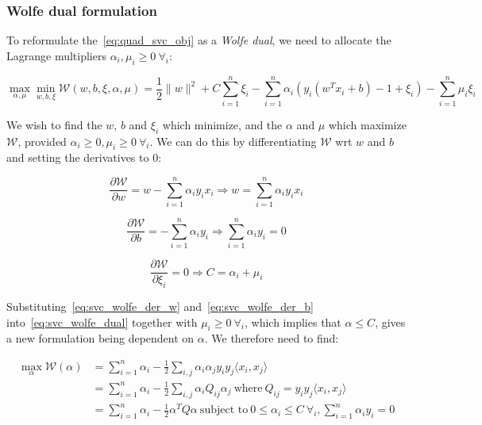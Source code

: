 \subsubsection{Wolfe dual formulation}

To reformulate the~\eqref{eq:quad_svc_obj} as a \emph{Wolfe dual}, we need to allocate the Lagrange multipliers $\alpha_i, \mu_i \geq 0 \ \forall_i$:

\begin{equation} \label{eq:svc_wolfe_dual}
    \max_{\alpha,\mu} \min_{w,b,\xi} \mathcal{W}(w,b,\xi,\alpha,\mu) = \frac{1}{2} \| w \|^2 + C \sum_{i=1}^n \xi_i-\sum_{i=1}^n \alpha_i(y_i(w^T x_i + b)-1+\xi_i)-\sum_{i=1}^n\mu_i\xi_i
\end{equation}

We wish to find the $w$, $b$ and $\xi_i$ which minimize, and the $\alpha$ and $\mu$ which maximize $\mathcal{W}$, provided $\alpha_i\geq 0, \mu_i \geq 0 \ \forall_i$. We can do this by differentiating $\mathcal{W}$ wrt $w$ and $b$ and setting the derivatives to 0:

\begin{equation} \label{eq:svc_wolfe_der_w}
	\frac{\partial \mathcal{W}}{\partial w}=w-\sum_{i=1}^n \alpha_i y_i x_i \Rightarrow w=\sum_{i=1}^n \alpha_i y_i x_i
\end{equation}

\begin{equation} \label{eq:svc_wolfe_der_b}
	\frac{\partial \mathcal{W}}{\partial b}=-\sum_{i=1}^n \alpha_i y_i\Rightarrow\sum_{i=1}^n \alpha_i y_i=0
\end{equation}

\begin{equation} \label{eq:svc_wolfe_der_xi}
	\frac{\partial \mathcal{W}}{\partial\xi_i}=0\Rightarrow C=\alpha_i+\mu_i
\end{equation}

Substituting~\eqref{eq:svc_wolfe_der_w} and~\eqref{eq:svc_wolfe_der_b} into~\eqref{eq:svc_wolfe_dual} together with $\mu_i\geq 0 \ \forall_i$, which implies that $\alpha\leq C$, gives a new formulation being dependent on $\alpha$. We therefore need to find:

\begin{equation} \label{eq:svc_max_wolfe_dual}
	\begin{aligned}
    	\max_{\alpha} \mathcal{W}(\alpha) &= \sum_{i=1}^n \alpha_i - \frac{1}{2}\sum_{i,j}\alpha_i\alpha_j y_i y_j \langle x_i, x_j \rangle \\
    	&= \sum_{i=1}^n \alpha_i - \frac{1}{2}\sum_{i,j}\alpha_i Q_{ij}\alpha_j \ \text{where} \ Q_{ij} = y_i y_j \langle x_i, x_j \rangle \\
    	&= \sum_{i=1}^n \alpha_i - \frac{1}{2}\alpha^T Q\alpha \ \text{subject to} \ 0\leq\alpha_i\leq C \ \forall_i, \sum_{i=1}^n \alpha_i y_i=0 
	\end{aligned}
\end{equation}

